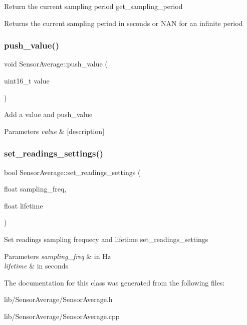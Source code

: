 Return the current sampling period  get\+\_\+sampling\+\_\+period \begin{DoxyReturn}{Returns}
the current sampling period in seconds or N\+AN for an infinite period 
\end{DoxyReturn}
\mbox{\label{classSensorAverage_a4d37d23977e05bc75fe6dd97cbd29cb5}} 
\subsubsection{\texorpdfstring{push\+\_\+value()}{push\_value()}}
{\footnotesize\ttfamily void Sensor\+Average\+::push\+\_\+value (\begin{DoxyParamCaption}\item[{uint16\+\_\+t}]{value }\end{DoxyParamCaption})}

Add a value and  push\+\_\+value 
\begin{DoxyParams}{Parameters}
{\em value} & \mbox{[}description\mbox{]} \\
\hline
\end{DoxyParams}
\mbox{\label{classSensorAverage_a49b21efd16d229bf9d034ea625f8535b}} 
\subsubsection{\texorpdfstring{set\+\_\+readings\+\_\+settings()}{set\_readings\_settings()}}
{\footnotesize\ttfamily bool Sensor\+Average\+::set\+\_\+readings\+\_\+settings (\begin{DoxyParamCaption}\item[{float}]{sampling\+\_\+freq,  }\item[{float}]{lifetime }\end{DoxyParamCaption})}

Set readings sampling frequecy and lifetime  set\+\_\+readings\+\_\+settings 
\begin{DoxyParams}{Parameters}
{\em sampling\+\_\+freq} & in Hz \\
\hline
{\em lifetime} & in seconds \\
\hline
\end{DoxyParams}


The documentation for this class was generated from the following files\+:\begin{DoxyCompactItemize}
\item 
lib/\+Sensor\+Average/Sensor\+Average.\+h\item 
lib/\+Sensor\+Average/Sensor\+Average.\+cpp\end{DoxyCompactItemize}
